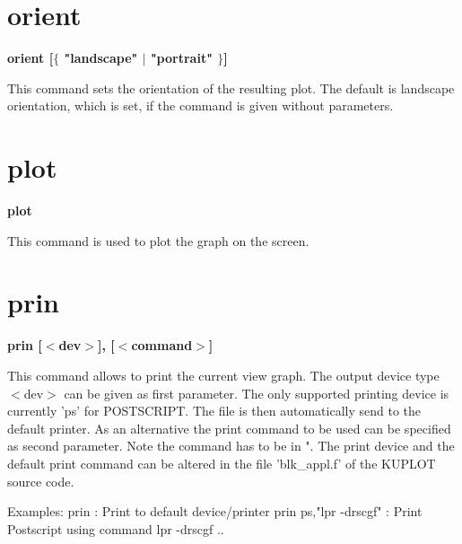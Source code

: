 \section{orient}
{\bf orient [$ \{$ "landscape" $| $ "portrait" $\} $] \par }
\par
\vspace{3pt}
This command sets the orientation of the resulting plot. The default 
is landscape orientation, which is set, if the command is given without 
parameters. 
\section{plot}
{\bf plot \par }
\par
\vspace{3pt}
This command is used to plot the graph on the screen. 
\section{prin}
{\bf prin [$ <$dev$> $], [$ <$command$> $] \par }
\par
\vspace{3pt}
This command allows to print the current view graph. The output 
device type $ <$dev$> $ can be given as first parameter. The only 
supported printing device is currently 'ps' for POSTSCRIPT. The 
file is then automatically send to the default printer. As an 
alternative the print command to be used can be specified as second 
parameter. Note the command has to be in ". The print device and 
the default print command can be altered in the file 'blk\_appl.f' 
of the KUPLOT source code. 
\par
\begin{MacVerbatim}
Examples:
prin                  : Print to default device/printer
prin ps,"lpr -drscgf" : Print Postscript using command lpr -drscgf ..
\end{MacVerbatim}
